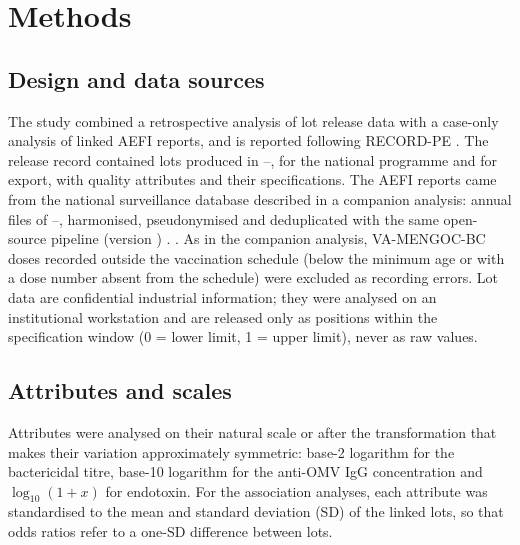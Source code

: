 \documentclass[11pt]{article}
\begin{document}
\section{Methods}\label{sec:methods}

\subsection{Design and data sources}\label{sec:design}
The study combined a retrospective analysis of lot release data with a case-only analysis of
linked AEFI reports, and is reported following RECORD-PE \cite{Langan2018}. The release record
contained \PTNLots{} lots produced in \PTLotFirstYear--\PTLotLastYear, \PTNNationalLots{} for the
national programme and \PTNExportLots{} for export, with \PTNAttributes{} quality attributes and
their specifications. The AEFI reports came from the national surveillance database described in a
companion analysis: \VNFiles{} annual files of \VStudyFirstYear--\VStudyLastYear, harmonised,
pseudonymised and deduplicated with the same open-source pipeline (version \VCodeVersion)
\cite{Kahn2016,ENISA2019}. \VFormSentence. As in the companion analysis, \PTScheduleExcluded{}
VA-MENGOC-BC doses recorded outside the vaccination schedule (below the minimum age or with a dose
number absent from the schedule) were excluded as recording errors. Lot data are confidential
industrial information; they were analysed
on an institutional workstation and are released only as positions within the specification
window (0 = lower limit, 1 = upper limit), never as raw values.

\subsection{Attributes and scales}\label{sec:scales}
Attributes were analysed on their natural scale or after the transformation that makes their
variation approximately symmetric: base-2 logarithm for the bactericidal titre, base-10 logarithm
for the anti-OMV IgG concentration and $\log_{10}(1+x)$ for endotoxin. For the association
analyses, each attribute was standardised to the mean and standard deviation (SD) of the linked
lots, so that odds ratios refer to a one-SD difference between lots.
\end{document}
